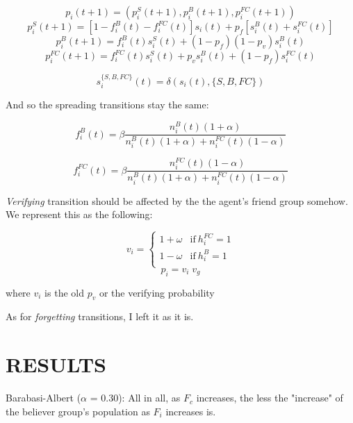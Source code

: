 \documentclass{article}
\begin{document}
\begin{equation}
  p_i(t+1) = (p_i^S(t+1),p_i^B(t+1),p_i^{FC}(t+1))
\end{equation}
\begin{equation}
  p_i^S(t+1) = [1-f_i^B(t)-f_i^{FC}(t)]s_i(t)+p_f[s_i^B(t)+s_i^{FC}(t)]
\end{equation}
\begin{equation}
  p_i^B(t+1) = f_i^B(t)s_i^S(t) + (1-p_f)(1-p_v)s_i^B(t)
\end{equation}
\begin{equation}
  p_i^{FC}(t+1) = f_i^{FC}(t)s_i^S(t) + p_vs_i^B(t)+(1-p_f)s_i^{FC}(t)
\end{equation}

\begin{equation}
  s_i^{\{S,B,FC\}}(t)=\delta(s_i(t), \{S,B,FC\})
\end{equation}

And so the spreading transitions stay the same:

\begin{equation}f_i^B(t)=\beta\frac{n_i^B(t)(1+\alpha)}{n_i^B(t)(1+\alpha)+n_i^{FC}(t)(1-\alpha)}\end{equation}

\begin{equation}f_i^{FC}(t)=\beta\frac{n_i^{FC}(t)(1-\alpha)}{n_i^B(t)(1+\alpha)+n_i^{FC}(t)(1-\alpha)}\end{equation}

\textit{Verifying} transition should be affected by the
the agent's friend group somehow. We represent this as
the following:

\begin{equation} 
  v_i = 
  \begin{cases} 
      1+\omega & \text{if}\ h_i^{FC} = 1 \\
      1-\omega & \text{if}\ h_i^B = 1 \\
  \end{cases}
\end{equation}
\begin{equation} p_i = v_i\;v_g \end{equation}

where $v_i$ is the old $p_v$ or the verifying probability

As for \textit{forgetting} transitions, I left it as it is.

\section{RESULTS}
Barabasi-Albert ($\alpha$ = 0.30): All in all, as $F_c$ increases, the less the "increase" of the believer group's population as $F_i$ increases is.
\end{document}
